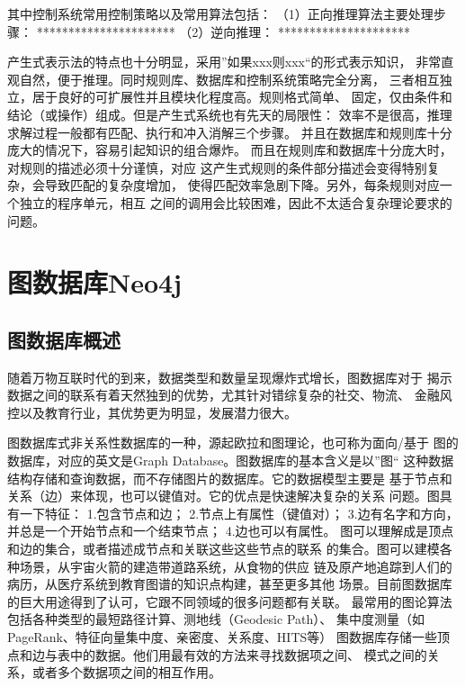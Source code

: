 \documentclass{standalone}
\begin{document}
其中控制系统常用控制策略以及常用算法包括：
（1）正向推理算法主要处理步骤：
**********************
（2）逆向推理：
*********************

产生式表示法的特点也十分明显，采用”如果xxx则xxx“的形式表示知识，
非常直观自然，便于推理。同时规则库、数据库和控制系统策略完全分离，
三者相互独立，居于良好的可扩展性并且模块化程度高。规则格式简单、
固定，仅由条件和结论（或操作）组成。但是产生式系统也有先天的局限性：
效率不是很高，推理求解过程一般都有匹配、执行和冲入消解三个步骤。
并且在数据库和规则库十分庞大的情况下，容易引起知识的组合爆炸。
而且在规则库和数据库十分庞大时，对规则的描述必须十分谨慎，对应
这产生式规则的条件部分描述会变得特别复杂，会导致匹配的复杂度增加，
使得匹配效率急剧下降。另外，每条规则对应一个独立的程序单元，相互
之间的调用会比较困难，因此不太适合复杂理论要求的问题。
\section{图数据库Neo4j}
\subsection{图数据库概述}
随着万物互联时代的到来，数据类型和数量呈现爆炸式增长，图数据库对于
揭示数据之间的联系有着天然独到的优势，尤其针对错综复杂的社交、物流、
金融风控以及教育行业，其优势更为明显，发展潜力很大。

图数据库式非关系性数据库的一种，源起欧拉和图理论，也可称为面向/基于
图的数据库，对应的英文是Graph Database。图数据库的基本含义是以”图“
这种数据结构存储和查询数据，而不存储图片的数据库。它的数据模型主要是
基于节点和关系（边）来体现，也可以键值对。它的优点是快速解决复杂的关系
问题。图具有一下特征：
1.包含节点和边；
2.节点上有属性（键值对）；
3.边有名字和方向，并总是一个开始节点和一个结束节点；
4.边也可以有属性。
图可以理解成是顶点和边的集合，或者描述成节点和关联这些这些节点的联系
的集合。图可以建模各种场景，从宇宙火箭的建造带道路系统，从食物的供应
链及原产地追踪到人们的病历，从医疗系统到教育图谱的知识点构建，甚至更多其他
场景。目前图数据库的巨大用途得到了认可，它跟不同领域的很多问题都有关联。
最常用的图论算法包括各种类型的最短路径计算、测地线（Geodesic Path）、
集中度测量（如PageRank、特征向量集中度、亲密度、关系度、HITS等）
图数据库存储一些顶点和边与表中的数据。他们用最有效的方法来寻找数据项之间、
模式之间的关系，或者多个数据项之间的相互作用。
\end{document}

